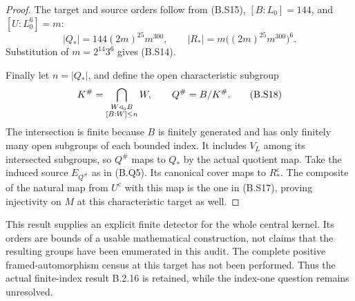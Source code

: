 \begin{proof}
The target and source orders follow from (B.S15),
$[B:L_0]=144$, and $[U:L_0^6]=m$:
\[
 |Q_*|=144(2m)^{25}m^{300},\qquad
 |R_*|=m\bigl((2m)^{25}m^{300}\bigr)^6.
\]
Substitution of $m=2^{14}3^6$ gives (B.S14).

Finally let $n=|Q_*|$, and define the open characteristic
subgroup
\[
 K^{\#}=\bigcap_{\substack{W\triangleleft_{\rm o}B\\
                           [B:W]\leq n}}W,
             \qquad Q^{\#}=B/K^{\#}.                           \tag{B.S18}
\]
The intersection is finite because $B$ is finitely
generated and has only finitely many open subgroups
of each bounded index.  It includes $V_L$ among its
intersected subgroups, so $Q^{\#}$ maps to $Q_*$ by
the actual quotient map.  Take the induced source
$E_{Q^{\#}}$ as in (B.Q5).  Its canonical cover maps
to $R_*^{\mathrm c}$.  The composite of the natural
map from $U^{\mathrm c}$ with this map is the one in
(B.S17), proving injectivity on $M$ at this
characteristic target as well.
\end{proof}

This result supplies an explicit finite detector for the
whole central kernel.  Its orders are bounds of a usable
mathematical construction, not claims that the resulting
groups have been enumerated in this audit.  The complete
positive framed-automorphism census at this target has
not been performed.  Thus the actual finite-index result
B.2.16 is retained, while the index-one question remains
unresolved.
